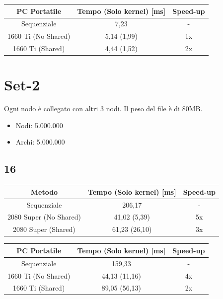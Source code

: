 \documentclass[12pt,a4paper]{report}
\begin{document}
			\bigbreak
			
			\begin{tabular}{|c|c|c|}
				\hline
				PC Portatile & Tempo (Solo kernel) [ms] & Speed-up \\
				\hline
				Sequenziale & 7,23 & -  \\
				\hline
				1660 Ti (No Shared) & 5,14 (1,99) & 1x \\
				\hline
				1660 Ti (Shared) & 4,44 (1,52) & 2x \\
				\hline
			\end{tabular}
			
		\section{Set-2}
		
			Ogni nodo è collegato con altri 3 nodi.
			Il peso del file è di 80MB.
		
			\begin{itemize}
				\item Nodi: 5.000.000
				\item Archi: 5.000.000
			\end{itemize}
		
			\subsection{16}
			
				\begin{tabular}{|c|c|c|}
					\hline
					Metodo & Tempo (Solo kernel) [ms] & Speed-up \\
					\hline
					Sequenziale & 206,17 & -  \\
					\hline
					2080 Super (No Shared) & 41,02 (5,39) & 5x \\
					\hline
					2080 Super (Shared) & 61,23 (26,10) & 3x \\
					\hline
				\end{tabular}
				
				\bigbreak
				
				\begin{tabular}{|c|c|c|}
					\hline
					PC Portatile & Tempo (Solo kernel) [ms] & Speed-up \\
					\hline
					Sequenziale & 159,33 & -  \\
					\hline
					1660 Ti (No Shared) & 44,13 (11,16) & 4x \\
					\hline
					1660 Ti (Shared) & 89,05 (56,13) & 2x \\
					\hline
				\end{tabular}
\end{document}

